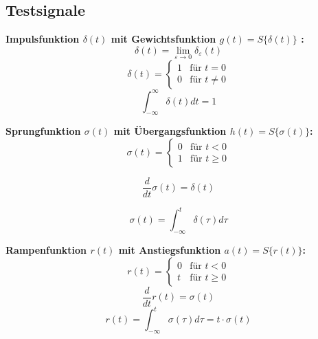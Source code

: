 \documentclass[german]{latex4ei/latex4ei_sheet}
\begin{document}
\subsection{Testsignale}
\begin{sectionbox}
\textbf{Impulsfunktion $\delta(t)$ mit Gewichtsfunktion $g(t) = S\{\delta(t)\}$ :}
$$\delta(t) = \lim_{\varepsilon \to 0} \delta_\varepsilon(t)$$
$$\delta(t) = \begin{cases}
1 & \text{für } t = 0 \\
0 & \text{für } t \neq 0
\end{cases}$$
$$ \int_{-\infty}^{\infty}\delta(t) dt = 1 $$

\textbf{Sprungfunktion $\sigma(t)$ mit Übergangsfunktion $h(t) = S\{\sigma(t)\}$:}
$$ \sigma(t) = \begin{cases}
0 & \text{für } t < 0 \\
1 & \text{für } t \geq 0
\end{cases}$$

$$ \frac{d}{dt}\sigma(t) = \delta(t)$$

$$ \sigma(t) = \int_{-\infty}^{t}\delta(\tau) d\tau$$

\textbf{Rampenfunktion $r(t)$ mit Anstiegsfunktion $a(t) = S\{r(t)\}$:}
$$ r(t) = \begin{cases}
0 & \text{für } t < 0 \\
t & \text{für } t \geq 0
\end{cases}$$
$$ \frac{d}{dt}r(t) = \sigma(t)$$
$$ r(t) = \int_{-\infty}^{t}\sigma(\tau) d\tau = t \cdot \sigma(t)$$

\end{sectionbox}
\end{document}
